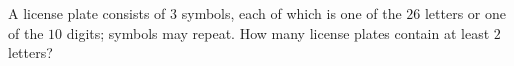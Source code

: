 A license plate consists of $3$ symbols, each of which is one of the $26$ letters or one of the $10$ digits; symbols may repeat. How many license plates contain at least $2$ letters?
